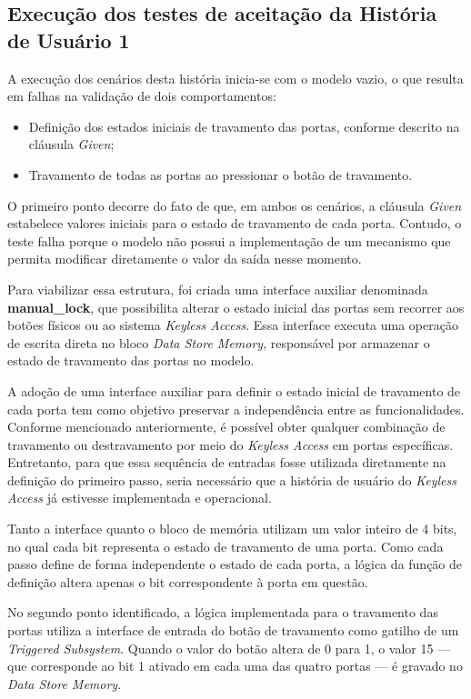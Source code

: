 \subsection{Execução dos testes de aceitação da História de Usuário 1}

A execução dos cenários desta história inicia-se com o modelo vazio, o que resulta em falhas na validação de dois comportamentos:

\begin{itemize}
	\item Definição dos estados iniciais de travamento das portas, conforme descrito na cláusula \textit{Given};
	\item Travamento de todas as portas ao pressionar o botão de travamento.
\end{itemize}

O primeiro ponto decorre do fato de que, em ambos os cenários, a cláusula \textit{Given} estabelece valores iniciais para o estado de travamento de cada porta. Contudo, 
o teste falha porque o modelo não possui a implementação de um mecanismo que permita modificar diretamente o valor da saída nesse momento.

Para viabilizar essa estrutura, foi criada uma interface auxiliar denominada \textbf{manual\_lock}, que possibilita alterar o estado inicial das portas sem recorrer aos 
botões físicos ou ao sistema \textit{Keyless Access}. Essa interface executa uma operação de escrita direta no bloco \textit{Data Store Memory}, responsável por armazenar o 
estado de travamento das portas no modelo.

A adoção de uma interface auxiliar para definir o estado inicial de travamento de cada porta tem como objetivo preservar a independência entre as funcionalidades. 
Conforme mencionado anteriormente, é possível obter qualquer combinação de travamento ou destravamento por meio do \textit{Keyless Access} em portas específicas. 
Entretanto, para que essa sequência de entradas fosse utilizada diretamente na definição do primeiro passo, seria necessário que a história de usuário do 
\textit{Keyless Access} já estivesse implementada e operacional.

Tanto a interface quanto o bloco de memória utilizam um valor inteiro de 4 bits, no qual cada bit representa o estado de travamento de uma porta. Como cada passo 
define de forma independente o estado de cada porta, a lógica da função de definição altera apenas o bit correspondente à porta em questão.

No segundo ponto identificado, a lógica implementada para o travamento das portas utiliza a interface de entrada do botão de travamento como gatilho de um 
\textit{Triggered Subsystem}. Quando o valor do botão altera de 0 para 1, o valor 15 — que corresponde ao bit 1 ativado em cada uma das quatro portas — é gravado 
no \textit{Data Store Memory}.

